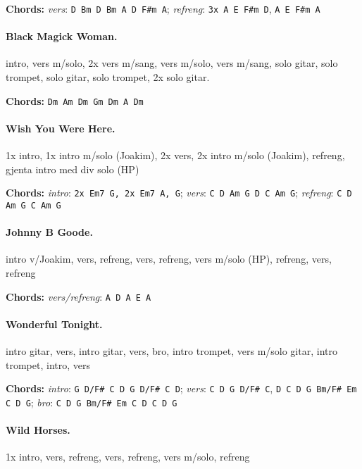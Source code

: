 \documentclass[%
twoside,                 %
final,                   %
10pt]{article}
\begin{document}
\textbf{Chords:} \emph{vers}: \Verb!D Bm D Bm A D F#m A!;
\emph{refreng}: \Verb!3x A E F#m D!, \Verb!A E F#m A!





\paragraph{Black Magick Woman.}
intro, vers m/solo, 2x vers m/sang, vers m/solo, vers m/sang, solo gitar, solo trompet, solo gitar, solo trompet, 2x solo gitar.

\textbf{Chords:} \Verb!Dm Am Dm Gm Dm A Dm!






\paragraph{Wish You Were Here.}
1x intro, 1x intro m/solo (Joakim), 2x vers, 2x intro m/solo (Joakim), refreng,
gjenta intro med div solo (HP)


\textbf{Chords:} \emph{intro}: \Verb!2x Em7 G, 2x Em7 A, G!;
\emph{vers}: \Verb!C D Am G D C Am G!; \emph{refreng}: \Verb!C D Am G C Am G!





\paragraph{Johnny B Goode.}
intro v/Joakim, vers, refreng, vers, refreng, vers m/solo (HP), refreng,
vers, refreng

\textbf{Chords:} \emph{vers/refreng}: \Verb!A D A E A!


\paragraph{Wonderful Tonight.}
intro gitar, vers, intro gitar, vers, bro, intro trompet, vers m/solo gitar, intro trompet, intro, vers

\textbf{Chords:} \emph{intro}: \Verb!G D/F# C D G D/F# C D!;
\emph{vers}:
\Verb!C D G D/F# C!, \Verb!D C D G Bm/F# Em C D G!;
\emph{bro}: \Verb!C D G Bm/F# Em C D C D G!




\paragraph{Wild Horses.}
1x intro, vers, refreng, vers, refreng, vers m/solo, refreng
\end{document}
